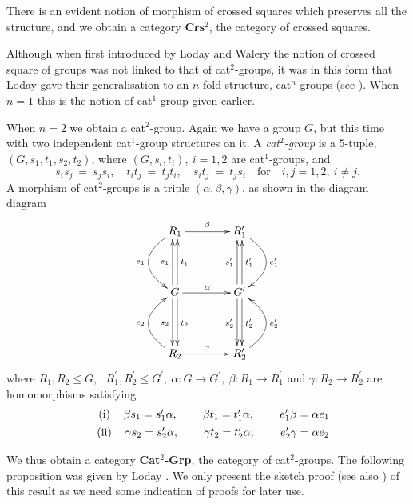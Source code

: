 \documentclass[a4paper,11pt]{article}
\theoremstyle{plain}
\theoremstyle{definition}
\begin{document}
There is an evident notion of morphism of crossed squares  
which preserves all the structure, 
and we obtain a category \textbf{Crs}$^{2}$, the category of crossed squares.

Although when first introduced by Loday and Walery \cite{walery} 
the notion of crossed square of groups was not linked to that of cat$^{2}$-groups, 
it was in this form that Loday gave their generalisation 
to an $n$-fold structure, cat$^{n}$-groups (see \cite{Loday}). 
When $n=1$ this is the notion of cat$^1$-group given earlier.

When $n=2$ we obtain a cat$^{2}$-group. 
Again we have a group $G$, but this time with two independent cat$^{1}$-group 
structures on it. 
A \emph{cat$^{2}$-group} is a $5$-tuple, $(G,s_1,t_1,s_2,t_2)$, 
where $(G,s_{i},t_{i}),~ i=1,2$ are cat$^{1}$-groups, and
\[
s_{i}s_{j} ~=~ s_{j}s_{i}, \quad 
t_{i}t_{j} ~=~ t_{j}t_{i}, \quad 
s_{i}t_{j} ~=~ t_{j}s_{i}
\quad\mbox{for}\quad i,j = 1,2,~ i\neq j. 
\]
A morphism of cat$^{2}$-groups is a triple $(\alpha ,\beta ,\gamma )$,
as shown in the diagram diagram
\[
\xymatrix@R=40pt@C=40pt 
{ R_1 \ar@/_2pc/[d]_{e_1} \ar[r]^{\beta} 
	& R'_1 \ar@/^2pc/[d]^{e'_1} \\
	G \ar@<0.5ex>[u]^{s_1} \ar@<-0.5ex>[u]_{t_1} \ar@<0.5ex>[d]^{t_2} 
	\ar@<-0.5ex>[d]_{s_2} \ar[r]^{\alpha} 
	& G' \ar@<0.5ex>[u]^{s'_1} \ar@<-0.5ex>[u]_{t'_1} \ar@<0.5ex>[d]^{t'_2} 
	\ar@<-0.5ex>[d]_{s'_2} \\
	R_2 \ar@/^2pc/[u]^{e_2} \ar[r]^{\gamma} 
	& R'_2 \ar@/_2pc/[u]_{e'_2} }
\]
\noindent where 
$R_{1},R_{2} \leq G$,~ $R_{1}^{\prime}, R_{2}^{\prime} \leq G^{\prime},~ 
\alpha : G \to G^{\prime},~ \beta : R_1 \to R^{\prime}_1$ 
and $\gamma : R_2 \to R^{\prime}_2$ are homomorphisms satisfying
\begin{eqnarray*}
	&&
	\begin{tabular}{llllll}
		$%
		\text{(i)}$ & $\beta s_1=s_1^{\prime}\alpha ,$ &  & $\beta
		t_1=t_1^{\prime}\alpha ,$ &  & $e_{1}^{\prime}\beta =\alpha e_{1}$%
	\end{tabular}
	\\
	&&
	\begin{tabular}{llllll}
		$\text{(ii)}$ & $\gamma s_2=s_2^{\prime}\alpha ,$ &  & $\gamma
		t_2=t_2^{\prime}\alpha ,$ &  & $e_{2}^{\prime}\gamma =\alpha e_{2}$%
	\end{tabular}%
\end{eqnarray*}

We thus obtain a category \textbf{Cat}$^{2}$\textbf{-Grp}, 
the category of cat$^{2}$-groups. 
The following proposition was given by Loday \cite{Loday}. 
We only present the sketch proof (see also \cite{mutpor}) of this result 
as we need some indication of proofs for later use.
\end{document}
